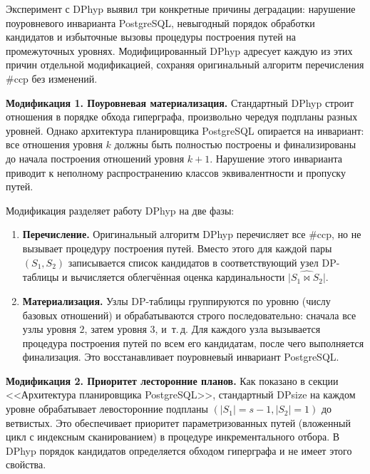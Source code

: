 Эксперимент с DPhyp выявил три конкретные причины деградации:
нарушение поуровневого инварианта PostgreSQL, невыгодный порядок
обработки кандидатов и избыточные вызовы процедуры построения путей
на промежуточных уровнях. Модифицированный DPhyp адресует каждую из этих
причин отдельной модификацией, сохраняя оригинальный алгоритм
перечисления \#ccp без изменений.
\par

\textbf{Модификация 1. Поуровневая материализация.}
Стандартный DPhyp строит отношения в порядке обхода гиперграфа,
произвольно чередуя подпланы разных уровней.
Однако архитектура планировщика PostgreSQL опирается на инвариант:
все отношения уровня $k$ должны быть полностью построены
и финализированы до начала построения отношений уровня $k+1$.
Нарушение этого инварианта приводит к неполному распространению
классов эквивалентности и пропуску путей.
\par

Модификация разделяет работу DPhyp на две фазы:
\begin{enumerate}
    \item \textbf{Перечисление.} Оригинальный алгоритм DPhyp перечисляет
    все \#ccp, но не вызывает процедуру построения путей.
    Вместо этого для каждой пары $(S_1, S_2)$ записывается
    список кандидатов в соответствующий узел DP-таблицы
    и вычисляется облегчённая оценка кардинальности $\widehat{|S_1 \Join S_2|}$.
    \item \textbf{Материализация.} Узлы DP-таблицы группируются по уровню
    (числу базовых отношений) и обрабатываются строго последовательно:
    сначала все узлы уровня $2$, затем уровня $3$, и~т.\,д.
    Для каждого узла вызывается процедура построения путей по всем
    его кандидатам, после чего выполняется финализация.
    Это восстанавливает поуровневый инвариант PostgreSQL.
\end{enumerate}

\textbf{Модификация 2. Приоритет лесторонние планов.}
Как показано в секции <<Архитектура планировщика PostgreSQL>>,
стандартный DPsize на каждом уровне обрабатывает
левосторонние подпланы $(|S_1| = s-1, |S_2| = 1)$ до ветвистых.
Это обеспечивает приоритет параметризованных путей
(вложенный цикл с индексным сканированием) в процедуре
инкрементального отбора.
В DPhyp порядок кандидатов определяется обходом гиперграфа
и не имеет этого свойства.
\par

